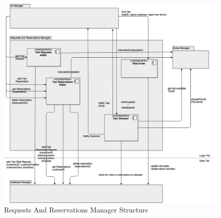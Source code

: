 \documentclass[../../../../../../../dd.tex]{subfiles}
\begin{document}
		\begin{figure}[H]
				\centering
				\includegraphics[width=\textwidth, scale=0.5]{../images/RequestsAndReservationsManager.png}
			\caption{Requests And Reservations Manager Structure}\label{fig:RequestsAndReservationsManager}
		\end{figure}
	
\end{document}

